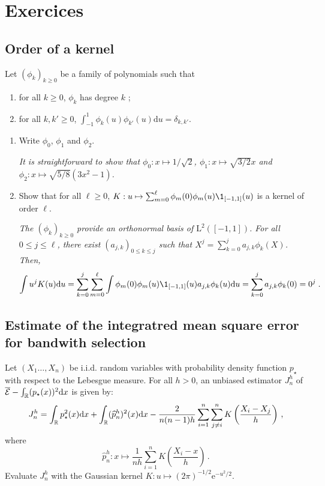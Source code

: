 \chapter{Exercices}
\minitoc

\section{Order of a kernel}
Let $(\phi_k)_{k\geqslant 0}$ be a family of polynomials such that
\begin{enumerate}[-]
\item for all $k\geqslant 0$, $\phi_k$ has degree $k$ ;
\item for all  $k,k'\geqslant 0$, $\int_{-1}^{1}\phi_k(u)\phi_{k'}(u)\mathrm{d} u = \delta_{k,k'}$.
\end{enumerate}

\begin{enumerate}
\item Write $\phi_0$, $\phi_1$ and $\phi_2$.

\vspace{.2cm}

{\em
It is straightforward to show that  $\phi_0: x\mapsto 1/\sqrt{2}$, $\phi_1: x\mapsto \sqrt{3/2}x$ and $\phi_2: x\mapsto \sqrt{5/8}(3 x^2-1) $.
}

\item Show that for all $\ell\geqslant 0$, $K: u\mapsto\sum_{m=0}^{\ell}\phi_m(0)\phi_m(u)\1_{[-1,1]}(u)$ is a kernel of order $\ell$.

\vspace{.2cm}

{\em
The  $(\phi_k)_{k\geqslant 0}$ provide an orthonormal basis of $\mathrm{L}^2([-1,1])$. For all $0\leqslant j\leqslant \ell$, there exist $(a_{j,k})_{0\leqslant k\leqslant j}$ such that $X^j = \sum_{k=0}^{j}a_{j,k}\phi_k(X)$. Then,
$$
\int u^jK(u)\rmd u = \sum_{k=0}^{j}\sum_{m=0}^{\ell}\int \phi_m(0)\phi_m(u)\1_{[-1,1]}(u)a_{j,k}\phi_k(u)\rmd u = \sum_{k=0}^{j}a_{j,k}\phi_k(0) = 0^j\eqsp.
$$
}
\end{enumerate}

\section{Estimate of the integratred mean square error for bandwith selection}
Let $(X_1\ldots,X_n)$ be i.i.d. random variables with probability density function $p_{\star}$ with respect to the Lebesgue measure. For all $h>0$, an unbiased estimator $J_n^h$ of $\overline{\mathcal{E}} - \int_{\mathbb{R}} (p_\star(x))^2\mathrm{d} x$ is given by:
\[
J_n^h = \int_{\mathbb{R}} p_{\star}^2(x)\mathrm{d} x + \int_{\mathbb{R}} (\widehat{p}^h_{n})^2(x)\mathrm{d} x - \frac{2}{n(n-1)h}\sum_{i=1}^n\sum_{j\neq i}^n K\left(\frac{X_i-X_j}{h}\right)\,,
\]
where
\[
\widehat{p}^h_n:x\mapsto \frac{1}{nh}\sum_{i=1}^nK\left(\frac{X_i-x}{h}\right)\,.
\]
Evaluate $J_n^h$ with the Gaussian kernel $K: u\mapsto (2\pi)^{-1/2}\mathrm{e}^{-u^2/2}$.

